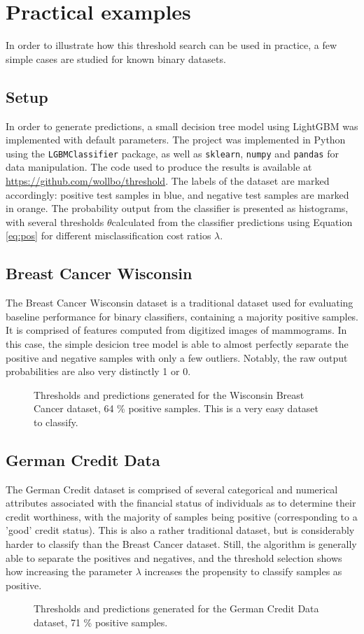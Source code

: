 \documentclass{article}
\begin{document}
\section{Practical examples}
In order to illustrate how this threshold search can be used in practice, a few simple cases are studied for known binary datasets.
\subsection{Setup}
In order to generate predictions, a small decision tree model using LightGBM was implemented with default parameters. The project was implemented in Python using the \texttt{LGBMClassifier} package, as well as \texttt{sklearn}, \texttt{numpy} and \texttt{pandas} for data manipulation. The code used to produce the results is available at \url{https://github.com/wollbo/threshold}. The labels of the dataset are marked accordingly: positive test samples in blue, and negative test samples are marked in orange. The probability output from the classifier is presented as histograms, with several thresholds $\theta$calculated from the classifier predictions using Equation \ref{eq:pos} for different misclassification cost ratios $\lambda$.
\subsection{Breast Cancer Wisconsin}
The Breast Cancer Wisconsin dataset is a traditional dataset used for evaluating baseline performance for binary classifiers, containing a majority positive samples. It is comprised of features computed from digitized images of mammograms. In this case, the simple desicion tree model is able to almost perfectly separate the positive and negative samples with only a few outliers. Notably, the raw output probabilities are also very distinctly 1 or 0.
\begin{figure}[H]
    \centering
    \scalebox{.8}{}
    \caption{Thresholds and predictions generated for the Wisconsin Breast Cancer dataset, 64 \% positive samples. This is a very easy dataset to classify.}
\end{figure}

\subsection{German Credit Data}
The German Credit dataset is comprised of several categorical and numerical attributes associated with the financial status of individuals as to determine their credit worthiness, with the majority of samples being positive (corresponding to a 'good' credit status). This is also a rather traditional dataset, but is considerably harder to classify than the Breast Cancer dataset. Still, the algorithm is generally able to separate the positives and negatives, and the threshold selection shows how increasing the parameter $\lambda$ increases the propensity to classify samples as positive.
\begin{figure}[H]
    \centering
    \scalebox{.8}{}
    \caption{Thresholds and predictions generated for the German Credit Data dataset, 71 \% positive samples.}
\end{figure}
\end{document}
